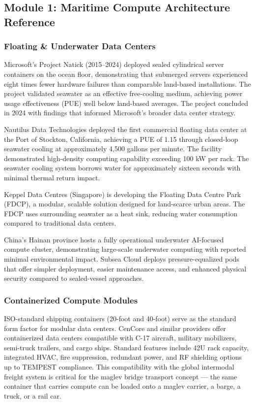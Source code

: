 \documentclass[11pt,letterpaper]{article}
\begin{document}
\subsection{Module 1: Maritime Compute Architecture Reference}

\subsubsection{Floating \& Underwater Data Centers}

Microsoft's Project Natick (2015--2024) deployed sealed cylindrical server containers on the ocean floor, demonstrating that submerged servers experienced eight times fewer hardware failures than comparable land-based installations. The project validated seawater as an effective free-cooling medium, achieving power usage effectiveness (PUE) well below land-based averages. The project concluded in 2024 with findings that informed Microsoft's broader data center strategy.

Nautilus Data Technologies deployed the first commercial floating data center at the Port of Stockton, California, achieving a PUE of 1.15 through closed-loop seawater cooling at approximately 4,500 gallons per minute. The facility demonstrated high-density computing capability exceeding 100 kW per rack. The seawater cooling system borrows water for approximately sixteen seconds with minimal thermal return impact.

Keppel Data Centres (Singapore) is developing the Floating Data Centre Park (FDCP), a modular, scalable solution designed for land-scarce urban areas. The FDCP uses surrounding seawater as a heat sink, reducing water consumption compared to traditional data centers.

China's Hainan province hosts a fully operational underwater AI-focused compute cluster, demonstrating large-scale underwater computing with reported minimal environmental impact. Subsea Cloud deploys pressure-equalized pods that offer simpler deployment, easier maintenance access, and enhanced physical security compared to sealed-vessel approaches.

\subsubsection{Containerized Compute Modules}

ISO-standard shipping containers (20-foot and 40-foot) serve as the standard form factor for modular data centers. CenCore and similar providers offer containerized data centers compatible with C-17 aircraft, military mobilizers, semi-truck trailers, and cargo ships. Standard features include 42U rack capacity, integrated HVAC, fire suppression, redundant power, and RF shielding options up to TEMPEST compliance. This compatibility with the global intermodal freight system is critical for the maglev bridge transport concept --- the same container that carries compute can be loaded onto a maglev carrier, a barge, a truck, or a rail car.
\end{document}
